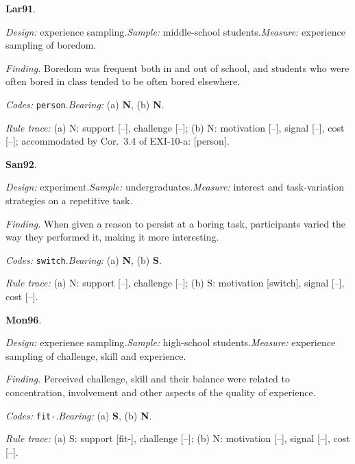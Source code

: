 \medskip
{}
\noindent\textbf{Lar91}\enspace \citet{LarsonRichards1991}.\par
{\small\noindent\textit{Design:} experience sampling.\quad \textit{Sample:} middle-school students.\quad \textit{Measure:} experience sampling of boredom.\par
\noindent\textit{Finding.} Boredom was frequent both in and out of school, and students who were often bored in class tended to be often bored elsewhere.\par
\noindent\textit{Codes:} \texttt{person}.\quad \textit{Bearing:} (a) \textbf{N}, (b) \textbf{N}.\par
\noindent\textit{Rule trace:} (a) N: support {[}--{]}, challenge {[}--{]}; (b) N: motivation {[}--{]}, signal {[}--{]}, cost {[}--{]}; accommodated by Cor.~3.4 of EXI-10-a: {[}person{]}.\par}
\medskip
{}
\noindent\textbf{San92}\enspace \citet{Sansone1992}.\par
{\small\noindent\textit{Design:} experiment.\quad \textit{Sample:} undergraduates.\quad \textit{Measure:} interest and task-variation strategies on a repetitive task.\par
\noindent\textit{Finding.} When given a reason to persist at a boring task, participants varied the way they performed it, making it more interesting.\par
\noindent\textit{Codes:} \texttt{switch}.\quad \textit{Bearing:} (a) \textbf{N}, (b) \textbf{S}.\par
\noindent\textit{Rule trace:} (a) N: support {[}--{]}, challenge {[}--{]}; (b) S: motivation {[}switch{]}, signal {[}--{]}, cost {[}--{]}.\par}
\medskip
{}
\noindent\textbf{Mon96}\enspace \citet{MonetaCsikszentmihalyi1996}.\par
{\small\noindent\textit{Design:} experience sampling.\quad \textit{Sample:} high-school students.\quad \textit{Measure:} experience sampling of challenge, skill and experience.\par
\noindent\textit{Finding.} Perceived challenge, skill and their balance were related to concentration, involvement and other aspects of the quality of experience.\par
\noindent\textit{Codes:} \texttt{fit-}.\quad \textit{Bearing:} (a) \textbf{S}, (b) \textbf{N}.\par
\noindent\textit{Rule trace:} (a) S: support {[}fit-{]}, challenge {[}--{]}; (b) N: motivation {[}--{]}, signal {[}--{]}, cost {[}--{]}.\par}
